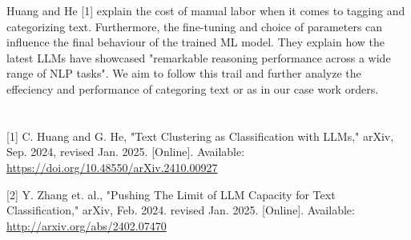 \documentclass{article}
\begin{document}





Huang and He [1] explain the cost of manual labor when it comes to tagging and categorizing text.
Furthermore, the fine-tuning and choice of parameters can influence the final behaviour of the trained
ML model.
They explain how the latest LLMs have showcased "remarkable reasoning performance across a wide range of
NLP tasks".
We aim to follow this trail and further analyze the effeciency and performance of categoring text or as in our
case work orders.

\section{\refname}

 [1] C. Huang and G. He, "Text Clustering as Classification with LLMs,"
arXiv, Sep. 2024, revised Jan. 2025. [Online].
Available: \url{https://doi.org/10.48550/arXiv.2410.00927}

[2] Y. Zhang et. al., "Pushing The Limit of LLM Capacity for Text Classification,"
arXiv, Feb. 2024. revised Jan. 2025. [Online].
Available: \url{http://arxiv.org/abs/2402.07470}
\end{document}
